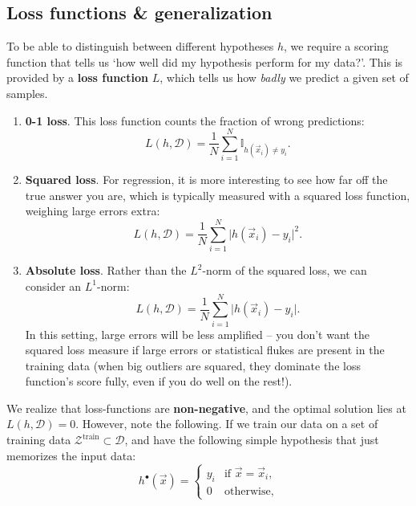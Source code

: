 \documentclass{article}
\begin{document}
\subsection{Loss functions \& generalization}
To be able to distinguish between different hypotheses $h$, we require a scoring function that tells us `how well did my hypothesis perform for my data?'. This is provided by a \textbf{loss function} $L$, which tells us how \textit{badly} we predict a given set of samples.
\begin{spexample}
    \begin{enumerate}\itemsep0em
        \item \textbf{0-1 loss}. This loss function counts the fraction of wrong predictions:
        \begin{equation}
            L(h,\mathcal{D}) = \frac{1}{N}\sum_{i=1}^N \mathbb{I}_{h(\vec{x}_i)\neq y_i}.
        \end{equation}
        \item \textbf{Squared loss}. For regression, it is more interesting to see how far off the true answer you are, which is typically measured with a squared loss function, weighing large errors extra:
        \begin{equation}
            L(h,\mathcal{D}) = \frac{1}{N}\sum_{i=1}^N \lvert h(\vec{x}_i)-y_i \rvert^2.
        \end{equation}
        \item \textbf{Absolute loss}. Rather than the $L^2$-norm of the squared loss, we can consider an $L^1$-norm:
        \begin{equation}
            L(h,\mathcal{D}) = \frac{1}{N}\sum_{i=1}^N \lvert h(\vec{x}_i)-y_i\rvert.
        \end{equation}
        In this setting, large errors will be less amplified -- you don't want the squared loss measure if large errors or statistical flukes are present in the training data (when big outliers are squared, they dominate the loss function's score fully, even if you do well on the rest!).
    \end{enumerate}
\end{spexample}
{\flushleft We} realize that loss-functions are \textbf{non-negative}, and the optimal solution lies at $L(h,\mathcal{D})=0$. However, note the following. If we train our data on a set of training data $\mathcal{Z}^\text{train}\subset\mathcal{D}$, and have the following simple hypothesis that just memorizes the input data:
\begin{equation}
    h^\bullet(\vec{x}) = \begin{cases} y_i & \text{if }\vec{x}=\vec{x}_i, \\ 0 & \text{otherwise}, \end{cases}
\end{equation}
\end{document}
